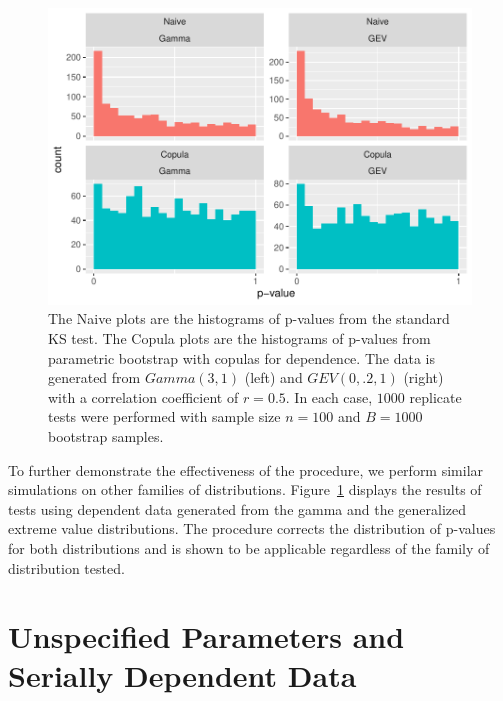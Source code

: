 \documentclass[12pt, letterpaper, titlepage]{article}
\begin{document}
\begin{figure}[tbp]
  \centering
  \includegraphics[width=\textwidth]{hist_gamma_gev_D}
  \caption{The Naive plots are the histograms of p-values from the standard KS 
  test. The Copula plots are the histograms of p-values from parametric 
  bootstrap with copulas for dependence. The data is generated from $Gamma(3, 
  1)$ (left) and $GEV(0, .2, 1)$ (right) with a correlation coefficient of $r = 
  0.5$. In each case, $1000$ replicate tests were performed with sample size $n 
  = 100$ and $B = 1000$ bootstrap samples.}
  \label{fig:hist_gamma_gev_D}
\end{figure}

To further demonstrate the effectiveness of the procedure, we perform similar 
simulations on other families of distributions. 
Figure~\ref{fig:hist_gamma_gev_D} displays the results of tests using dependent 
data generated from the gamma and the generalized extreme value distributions.
The procedure corrects the distribution of p-values for both distributions and 
is shown to be applicable regardless of the family of distribution tested.


\section{Unspecified Parameters and Serially Dependent Data}
\label{sec:fittedwithdependence}
\end{document}
